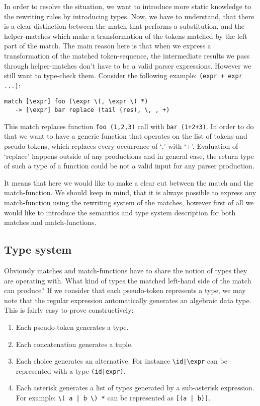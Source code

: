 In order to resolve the situation, we want to introduce more static
knowledge to the rewriting rules by introducing types.  Now, we have
to understand, that there is a clear distinction between the match
that performs a substitution, and the helper-matches which make 
a transformation of the tokens matched by the left part of the match.
The main reason here is that when we express a transformation of the
matched token-sequence, the intermediate results we pass through
helper-matches don't have to be a valid parser expressions.  However
we still want to type-check them.  Consider the following example:
\verb|(expr + expr ...)|:
\begin{verbatim}
match [\expr] foo (\expr \(, \expr \) *)  
   -> [\expr] bar replace (tail (res), \, , +)
\end{verbatim}

This match replaces function \verb|foo (1,2,3)| call with
\verb|bar (1+2+3)|.  In order to do that we want to have
a generic function that operates on the list of tokens and
pseudo-tokens, which replaces every occurrence of `,' with
`+'.  Evaluation of `replace' happens outside of any productions
and in general case, the return type of such a type of a function
could be not a valid input for any parser production.

It means that here we would like to make a clear cut between the
match and the match-function.  We should keep in mind, that it
is always possible to express any match-function using the 
rewriting system of the matches, however first of all we would
like to introduce the semantics and type system description for
both matches and match-functions.

\subsection{Type system}
Obviously matches and match-functions have to share the notion
of types they are operating with.  What kind of types the matched
left-hand side of the match can produce?  If we consider that each
pseudo-token represents a type, we may note that the regular 
expression automatically generates an algebraic data type.  This
is fairly easy to prove constructively:
\begin{enumerate}
    \item Each pseudo-token generates a type.
    \item Each concatenation generates a tuple.
    \item Each choice generates an alternative.  For instance 
    \verb/\id|\expr/ can be represented with a type \verb/(id|expr)/.
    \item Each asterisk generates a list of types generated by 
    a sub-asterisk expression.  For example: \verb/\( a | b \) */
    can be represented as \verb/[(a | b)]/.
\end{enumerate}

